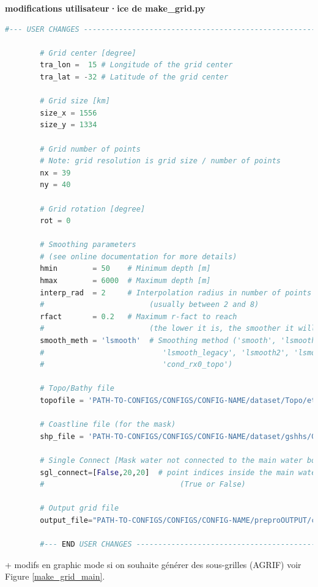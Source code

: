 \documentclass[10pt,a4paper,titlepage]{article}
\begin{document}
\begin{codeEnv}{\textbf{modifications utilisateur·ice de make\_grid.py}}
    \begin{lstlisting}[language=python]
        #--- USER CHANGES ---------------------------------------------------------

        # Grid center [degree]
        tra_lon =  15 # Longitude of the grid center
        tra_lat = -32 # Latitude of the grid center

        # Grid size [km]
        size_x = 1556
        size_y = 1334

        # Grid number of points
        # Note: grid resolution is grid size / number of points
        nx = 39
        ny = 40

        # Grid rotation [degree]
        rot = 0

        # Smoothing parameters
        # (see online documentation for more details)
        hmin        = 50    # Minimum depth [m]
        hmax        = 6000  # Maximum depth [m]
        interp_rad  = 2     # Interpolation radius in number of points
        #                        (usually between 2 and 8)
        rfact       = 0.2   # Maximum r-fact to reach
        #                        (the lower it is, the smoother it will be)
        smooth_meth = 'lsmooth'  # Smoothing method ('smooth', 'lsmooth',
        #                           'lsmooth_legacy', 'lsmooth2', 'lsmooth1',
        #                           'cond_rx0_topo')

        # Topo/Bathy file
        topofile = 'PATH-TO-CONFIGS/CONFIGS/CONFIG-NAME/dataset/Topo/etopo2.nc'

        # Coastline file (for the mask)
        shp_file = 'PATH-TO-CONFIGS/CONFIGS/CONFIG-NAME/dataset/gshhs/GSHHS_i_L1.shp'

        # Single Connect [Mask water not connected to the main water body]
        sgl_connect=[False,20,20]  # point indices inside the main water body
        #                               (True or False)

        # Output grid file
        output_file="PATH-TO-CONFIGS/CONFIGS/CONFIG-NAME/preproOUTPUT/croco_grd.nc"

        #--- END USER CHANGES -----------------------------------------------------
    \end{lstlisting}
\end{codeEnv}
+ modifs en graphic mode si on souhaite générer des sous-grilles (AGRIF) voir Figure \ref{make_grid_main}.
\end{document}
